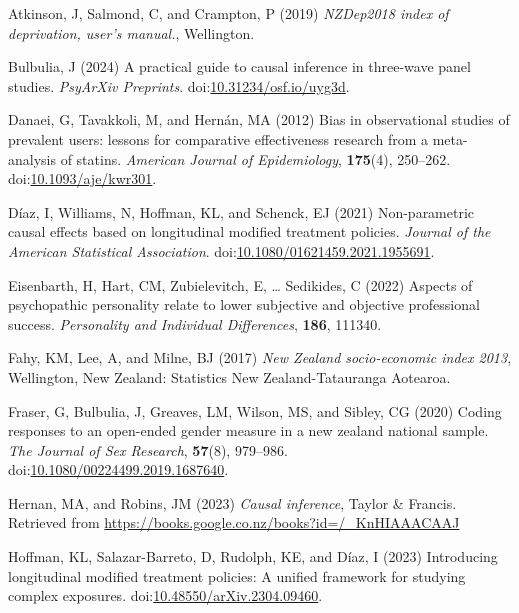 \documentclass[
  singlecolumn]{article}
\newlength{\cslhangindent}
\newenvironment{CSLReferences}[2] %
 {\begin{list}{}{%
  \setlength{\itemindent}{0pt}
  \setlength{\leftmargin}{0pt}
  \setlength{\parsep}{0pt}
  \ifodd #1
   \setlength{\leftmargin}{\cslhangindent}
   \setlength{\itemindent}{-1\cslhangindent}
  \fi
  \setlength{\itemsep}{#2\baselineskip}}}
 {\end{list}}
\begin{document}
\label{refs}
\begin{CSLReferences}{1}{0}
Atkinson, J, Salmond, C, and Crampton, P (2019) \emph{NZDep2018 index of
deprivation, user{'}s manual.}, Wellington.

Bulbulia, J (2024) A practical guide to causal inference in three-wave
panel studies. \emph{PsyArXiv Preprints}.
doi:\href{https://doi.org/10.31234/osf.io/uyg3d}{10.31234/osf.io/uyg3d}.

Danaei, G, Tavakkoli, M, and Hernán, MA (2012) Bias in observational
studies of prevalent users: lessons for comparative effectiveness
research from a meta-analysis of statins. \emph{American Journal of
Epidemiology}, \textbf{175}(4), 250--262.
doi:\href{https://doi.org/10.1093/aje/kwr301}{10.1093/aje/kwr301}.

Díaz, I, Williams, N, Hoffman, KL, and Schenck, EJ (2021) Non-parametric
causal effects based on longitudinal modified treatment policies.
\emph{Journal of the American Statistical Association}.
doi:\href{https://doi.org/10.1080/01621459.2021.1955691}{10.1080/01621459.2021.1955691}.

Eisenbarth, H, Hart, CM, Zubielevitch, E, \ldots{} Sedikides, C (2022)
Aspects of psychopathic personality relate to lower subjective and
objective professional success. \emph{Personality and Individual
Differences}, \textbf{186}, 111340.

Fahy, KM, Lee, A, and Milne, BJ (2017) \emph{New Zealand socio-economic
index 2013}, Wellington, New Zealand: Statistics New Zealand-Tatauranga
Aotearoa.

Fraser, G, Bulbulia, J, Greaves, LM, Wilson, MS, and Sibley, CG (2020)
Coding responses to an open-ended gender measure in a new zealand
national sample. \emph{The Journal of Sex Research}, \textbf{57}(8),
979--986.
doi:\href{https://doi.org/10.1080/00224499.2019.1687640}{10.1080/00224499.2019.1687640}.

Hernan, MA, and Robins, JM (2023) \emph{Causal inference}, Taylor \&
Francis. Retrieved from
\url{https://books.google.co.nz/books?id=/_KnHIAAACAAJ}

Hoffman, KL, Salazar-Barreto, D, Rudolph, KE, and Díaz, I (2023)
Introducing longitudinal modified treatment policies: A unified
framework for studying complex exposures.
doi:\href{https://doi.org/10.48550/arXiv.2304.09460}{10.48550/arXiv.2304.09460}.


\end{CSLReferences}
\end{document}

